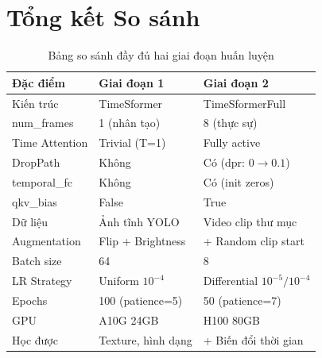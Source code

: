 \documentclass[12pt,a4paper]{article}
\begin{document}
\section{Tổng kết So sánh}

\begin{table}[h!]
\centering
{}
\begin{tabular}{lll}
\toprule
\textbf{Đặc điểm} & \textbf{Giai đoạn 1} & \textbf{Giai đoạn 2} \\
\midrule
Kiến trúc & TimeSformer & TimeSformerFull \\
num\_frames & 1 (nhân tạo) & 8 (thực sự) \\
Time Attention & Trivial (T=1) & Fully active \\
DropPath & Không & Có (dpr: $0\to0.1$) \\
temporal\_fc & Không & Có (init zeros) \\
qkv\_bias & False & True \\
Dữ liệu & Ảnh tĩnh YOLO & Video clip thư mục \\
Augmentation & Flip + Brightness & + Random clip start \\
Batch size & 64 & 8 \\
LR Strategy & Uniform $10^{-4}$ & Differential $10^{-5}/10^{-4}$ \\
Epochs & 100 (patience=5) & 50 (patience=7) \\
GPU & A10G 24GB & H100 80GB \\
Học được & Texture, hình dạng & + Biến đổi thời gian \\
\bottomrule
\end{tabular}
\caption{Bảng so sánh đầy đủ hai giai đoạn huấn luyện}
\end{table}
\end{document}
